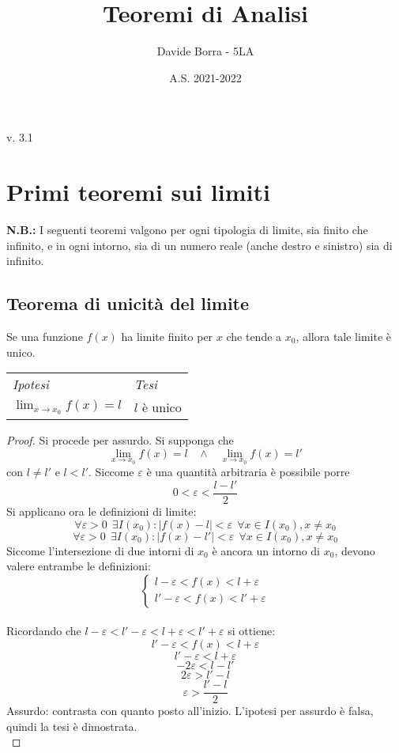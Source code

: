 \documentclass{article}     %
\title{Teoremi di Analisi}
\author{Davide Borra - 5LA}
\date{A.S. 2021-2022}
\begin{document}
\chead{}
\begin{titlepage}
    \maketitle
    \tableofcontents
    \hspace{\fill} v. 3.1   %
\end{titlepage}
\section{Primi teoremi sui limiti}
\textbf{N.B.:} I seguenti teoremi valgono per ogni tipologia di limite, sia finito che infinito, e in ogni intorno, sia di un numero reale (anche destro e sinistro) sia di infinito.
    \subsection{Teorema di unicità del limite}
        \begin{shadedTheorem}
            Se una funzione $f(x)$ ha limite finito per $x$ che tende a $x_0$, allora tale limite è unico.
        \end{shadedTheorem}
        \begin{tabular}{m{}m{}}
            \textit{Ipotesi} & \textit{Tesi}  \\
            $\displaystyle\lim_{x\rightarrow x_0}f(x) = l$ & $l$ è unico
        \end{tabular}
        
        \begin{proof}
        Si procede per assurdo. Si supponga che 
        \[\lim_{x\rightarrow x_0}f(x) = l~~~~\land~~~~ \lim_{x\rightarrow x_0}f(x) = l'\]
        con $l\neq l'$ e $l<l'$.
        Siccome $\varepsilon$ è una quantità arbitraria è possibile porre \[0<\varepsilon<\frac{l-l'}{2}\]
        Si applicano ora le definizioni di limite:
        \[\forall \varepsilon > 0 ~~\exists I(x_0) : |f(x)-l|<\varepsilon~~\forall x \in I(x_0), x\neq x_0\]
        \[\forall \varepsilon > 0 ~~\exists I(x_0) : |f(x)-l'|<\varepsilon~~\forall x \in I(x_0), x\neq x_0\]
        Siccome l'intersezione di due intorni di $x_0$ è ancora un intorno di $x_0$, devono valere entrambe le definizioni:
        \[\left\{\begin{array}{l}
            l-\varepsilon < f(x) < l+\varepsilon\\
            l'-\varepsilon < f(x) < l'+\varepsilon 
        \end{array}\right.\]
        \\Ricordando che $l-\varepsilon<l'-\varepsilon < l+\varepsilon < l'+\varepsilon$ si ottiene:
        \[l'-\varepsilon < f(x) < l+\varepsilon\]
        \[l'-\varepsilon < l+\varepsilon\]
        \[-2\varepsilon<l-l'\]
        \[2\varepsilon > l'-l\]
        \[\varepsilon > \frac{l'-l}{2}\]
        Assurdo: contrasta con quanto posto all'inizio. L'ipotesi per assurdo è falsa, quindi la tesi è dimostrata.\\
        \end{proof}
        
\end{document}
